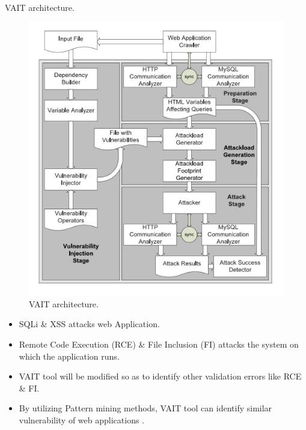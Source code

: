 \documentclass[xcolor=x11names,compress]{beamer}
\renewcommand{\(}{\begin{columns}}
\renewcommand{\)}{\end{columns}}
\newcommand{\<}[1]{\begin{column}{#1}}
\renewcommand{\>}{\end{column}}
\begin{document}
\begin{frame}{VAIT architecture.}
\begin{figure}
\centering
\includegraphics[width=0.7\linewidth]{Main/fig7}
\caption{VAIT architecture.}
\label{fig:fig7}
\end{figure}

\end{frame}
\begin{frame}
	\begin{itemize}
		\item SQLi \& XSS attacks web Application.\newline
		\item Remote Code Execution (RCE) \& File Inclusion (FI) attacks the system on which the application runs.\newline
		\item VAIT tool will be modified so as to identify other validation errors like RCE \& FI.\newline
		\item By utilizing Pattern mining methods, VAIT tool can identify similar vulnerability of web applications .
	\end{itemize}
\end{frame}
\end{document}
